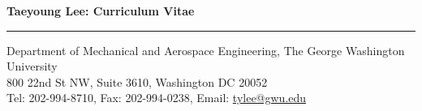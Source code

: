 \documentclass[10pt]{article}
\newif\ifdatabase
\begin{document}
\allowdisplaybreaks

\nocite{*}    
\ifdatabase
    \DTLsettabseparator
    \DTLsavedb{mybib}{tylee_db.txt}
    \DTLsort{Year=descending,Month=descending}{mybib}
\fi

\begin{center}
{\Large\bf Taeyoung Lee: Curriculum Vitae}\\\vspace*{-0.2cm}\rule{\linewidth}{0.2mm}
Department of Mechanical and Aerospace Engineering, The George Washington University\\
800 22nd St NW, Suite 3610, Washington DC 20052\\
Tel: 202-994-8710, \quad Fax: 202-994-0238, \quad Email: \url{tylee@gwu.edu}
\end{center}

\vspace*{0.4cm}

\setlength{\tabcolsep}{0cm}
\end{document}

